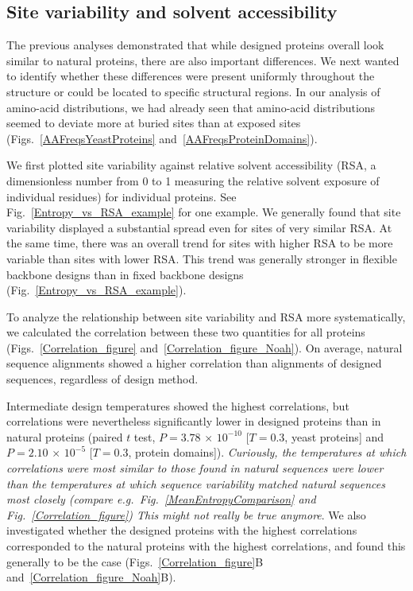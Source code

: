 \documentclass[12pt]{article}
\begin{document}
\subsection{Site variability and solvent accessibility}
\label{ProteinStructure}

The previous analyses demonstrated that while designed proteins overall look similar to natural proteins, there are also important differences. We next wanted to identify whether these differences were present uniformly throughout the structure or could be located to specific structural regions. In our analysis of amino-acid distributions, we had already seen that amino-acid distributions seemed to deviate more at buried sites than at exposed sites (Figs.~\ref{AAFreqsYeastProteins} and~\ref{AAFreqsProteinDomains}).

We first plotted site variability against relative solvent accessibility (RSA, a dimensionless number from 0 to 1 measuring the relative solvent exposure of individual residues) for individual proteins. See Fig.~\ref{Entropy_vs_RSA_example} for one example. We generally found that site variability displayed a substantial spread even for sites of very similar RSA. At the same time, there was an overall trend for sites with higher RSA to be more variable than sites with lower RSA. This trend was generally stronger in flexible backbone designs than in fixed backbone designs (Fig.~\ref{Entropy_vs_RSA_example}).

To analyze the relationship between site variability and RSA more systematically, we calculated the correlation between these two quantities for all proteins (Figs.~\ref{Correlation_figure} and~\ref{Correlation_figure_Noah}). On average, natural sequence alignments showed a higher correlation than alignments of designed sequences, regardless of design method. 

{\color{red}Intermediate design temperatures showed the highest correlations, but correlations were nevertheless significantly lower in designed proteins than in natural proteins (paired $t$ test, $P=  3.78$  $\times$  $10^{-10}$ [$T=0.3$, yeast proteins] and $P= 2.10$ $\times$  $10^{-5} $ [$T=0.3$, protein domains]). \emph{Curiously, the temperatures at which correlations were most similar to those found in natural sequences were lower than the temperatures at which sequence variability matched natural sequences most closely (compare e.g.\ Fig.~\ref{MeanEntropyComparison} and Fig.~\ref{Correlation_figure}) This might not really be true anymore}. We also investigated whether the designed proteins with the highest correlations corresponded to the natural proteins with the highest correlations, and found this generally to be the case (Figs.~\ref{Correlation_figure}B and~\ref{Correlation_figure_Noah}B).}
\end{document}
